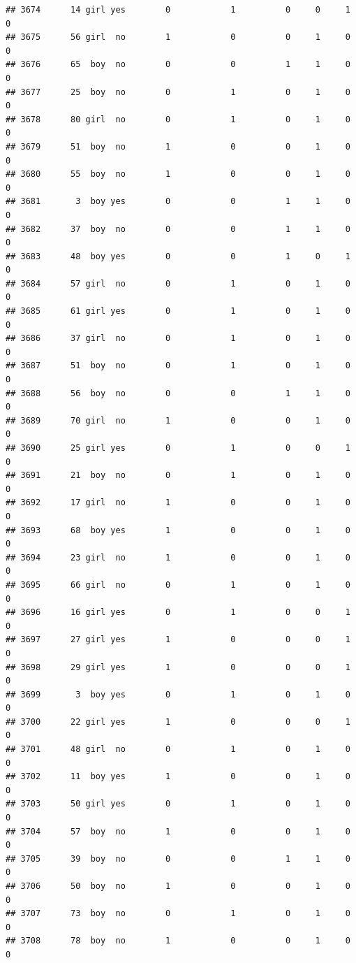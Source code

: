 \documentclass[man]{apa6}
\begin{document}
\begin{verbatim}
## 3674      14 girl yes        0            1          0     0     1     0
## 3675      56 girl  no        1            0          0     1     0     0
## 3676      65  boy  no        0            0          1     1     0     0
## 3677      25  boy  no        0            1          0     1     0     0
## 3678      80 girl  no        0            1          0     1     0     0
## 3679      51  boy  no        1            0          0     1     0     0
## 3680      55  boy  no        1            0          0     1     0     0
## 3681       3  boy yes        0            0          1     1     0     0
## 3682      37  boy  no        0            0          1     1     0     0
## 3683      48  boy yes        0            0          1     0     1     0
## 3684      57 girl  no        0            1          0     1     0     0
## 3685      61 girl yes        0            1          0     1     0     0
## 3686      37 girl  no        0            1          0     1     0     0
## 3687      51  boy  no        0            1          0     1     0     0
## 3688      56  boy  no        0            0          1     1     0     0
## 3689      70 girl  no        1            0          0     1     0     0
## 3690      25 girl yes        0            1          0     0     1     0
## 3691      21  boy  no        0            1          0     1     0     0
## 3692      17 girl  no        1            0          0     1     0     0
## 3693      68  boy yes        1            0          0     1     0     0
## 3694      23 girl  no        1            0          0     1     0     0
## 3695      66 girl  no        0            1          0     1     0     0
## 3696      16 girl yes        0            1          0     0     1     0
## 3697      27 girl yes        1            0          0     0     1     0
## 3698      29 girl yes        1            0          0     0     1     0
## 3699       3  boy yes        0            1          0     1     0     0
## 3700      22 girl yes        1            0          0     0     1     0
## 3701      48 girl  no        0            1          0     1     0     0
## 3702      11  boy yes        1            0          0     1     0     0
## 3703      50 girl yes        0            1          0     1     0     0
## 3704      57  boy  no        1            0          0     1     0     0
## 3705      39  boy  no        0            0          1     1     0     0
## 3706      50  boy  no        1            0          0     1     0     0
## 3707      73  boy  no        0            1          0     1     0     0
## 3708      78  boy  no        1            0          0     1     0     0

\end{verbatim}
\end{document}
